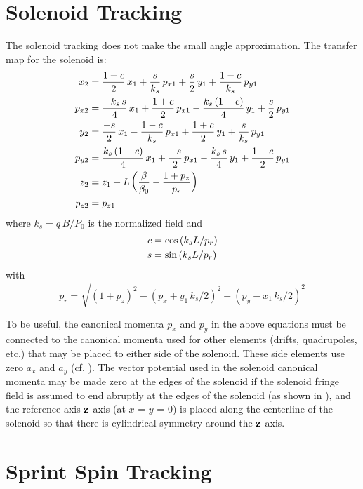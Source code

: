 \section{Solenoid Tracking}
\label{s:solenoid.std}

The  solenoid tracking does not make the small angle approximation.
The transfer map for the solenoid is:
\begin{align}
  x_2    &= \frac{1 + c}{2} \, x_1 + \frac{s}{k_s} \, p_{x1} +
           \frac{s}{2} \, y_1 + \frac{1 - c}{k_s} \, p_{y1} \nonumber \\
  p_{x2} &= \frac{-k_s \, s}{4} \, x_1 + \frac{1 + c}{2} \, p_{x1} - 
           \frac{k_s \, (1 - c)}{4} \, y_1 + \frac{s}{2} \, p_{y1} \nonumber \\
  y_2    &= \frac{-s}{2} \, x_1 - \frac{1 - c}{k_s} \, p_{x1} +
           \frac{1 + c}{2} \, y_1 + \frac{s}{k_s} \, p_{y1} \\      
  p_{y2} &= \frac{k_s \, (1 - c)}{4} \, x_1 + \frac{-s}{2} \, p_{x1} -
            \frac{k_s \, s}{4} \, y_1 + \frac{1 + c}{2} \, p_{y1} \nonumber \\ 
  z_2    &= z_1 + L \left( \frac{\beta}{\beta_0} - \frac{1+p_z}{p_r} \right) \nonumber \\
  p_{z2} &= p_{z1} \nonumber
\end{align}
where $k_s = q \, B/P_0$ is the normalized field and
\begin{align}
  c &= \cos \left( k_s L / p_r \right) \nonumber \\
  s &= \sin \left( k_s L / p_r \right)
\end{align}
with
\begin{equation}
  p_r = \sqrt{(1 + p_z)^2 - (p_x + y_1 \, k_s/2)^2 - (p_y - x_1 \, k_s/2)^2}
\end{equation}

To be useful, the canonical momenta $p_x$ and $p_y$ in the above equations must be connected to the
canonical momenta used for other elements (drifts, quadrupoles, etc.) that may be placed to either
side of the solenoid. These side elements use zero $a_x$ and $a_y$ (cf. ). The vector
potential used in the solenoid canonical momenta may be made zero at the edges of the solenoid if
the solenoid fringe field is assumed to end abruptly at the edges of the solenoid (as shown in
), and the reference axis ${\bf z}$-axis (at $x$ = $y$ = 0) is placed along the
centerline of the solenoid so that there is cylindrical symmetry around the ${\bf z}$-axis.

\section{Sprint Spin Tracking}
\label{s:sprint.std}

